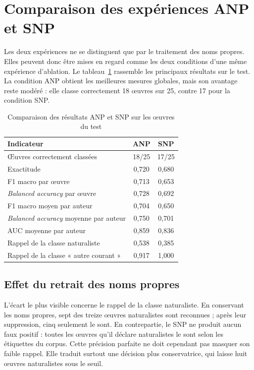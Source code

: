 \section{Comparaison des expériences ANP et SNP}
\label{sec:comparaison_anp_snp}

Les deux expériences ne se distinguent que par le traitement des noms propres. Elles peuvent donc être mises en regard comme les deux conditions d'une même expérience d'ablation. Le tableau~\ref{tab:comparaison_anp_snp} rassemble les principaux résultats sur le test. La condition ANP obtient les meilleures mesures globales, mais son avantage reste modéré : elle classe correctement 18 œuvres sur 25, contre 17 pour la condition SNP.

\begin{table}[H]
    \centering
    \caption{Comparaison des résultats ANP et SNP sur les œuvres du test}
    \label{tab:comparaison_anp_snp}
    \small
    \setlength{\tabcolsep}{7pt}
    \begin{tabularx}{\textwidth}{>{\raggedright\arraybackslash}X c c}
        \toprule
        \textbf{Indicateur} & \textbf{ANP} & \textbf{SNP} \\
        \midrule
        Œuvres correctement classées & 18/25 & 17/25 \\
        Exactitude & 0,720 & 0,680 \\
        F1 macro par œuvre & 0,713 & 0,653 \\
        \textit{Balanced accuracy} par œuvre & 0,728 & 0,692 \\
        F1 macro moyen par auteur & 0,704 & 0,650 \\
        \textit{Balanced accuracy} moyenne par auteur & 0,750 & 0,701 \\
        AUC moyenne par auteur & 0,859 & 0,836 \\
        Rappel de la classe naturaliste & 0,538 & 0,385 \\
        Rappel de la classe « autre courant » & 0,917 & 1,000 \\
        \bottomrule
    \end{tabularx}
\end{table}

\subsection{Effet du retrait des noms propres}

L'écart le plus visible concerne le rappel de la classe naturaliste. En conservant les noms propres, sept des treize œuvres naturalistes sont reconnues ; après leur suppression, cinq seulement le sont. En contrepartie, le SNP ne produit aucun faux positif : toutes les œuvres qu'il déclare naturalistes le sont selon les étiquettes du corpus. Cette précision parfaite ne doit cependant pas masquer son faible rappel. Elle traduit surtout une décision plus conservatrice, qui laisse huit œuvres naturalistes sous le seuil.

